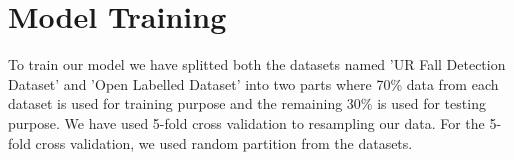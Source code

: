 


\section{Model Training}
To train our model we have splitted both the datasets named 'UR Fall Detection Dataset' and 'Open Labelled Dataset' into two parts where 70\% data from each dataset is used for training purpose and the remaining 30\% is used for testing purpose. We have used 5-fold cross validation to resampling our data. For the 5-fold cross validation, we used random partition from the datasets.

